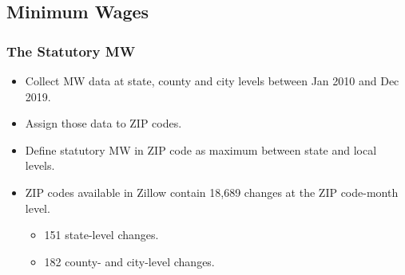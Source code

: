 
\subsection{Minimum Wages}

\begin{frame}[label=stat_MW]
	\frametitle{The Statutory MW}
	
	\begin{itemize}
		\item
		Collect MW data at state, county and city levels between Jan 2010 and Dec 2019.
		
		\vspace{2mm} \item
		Assign those data to ZIP codes.
		
		\vspace{2mm} \item
		Define statutory MW in ZIP code as maximum between state and local levels.
		
		\pause
		\vspace{2mm} \item
		ZIP codes available in Zillow contain 18,689 changes at the ZIP code-month level.
		\vspace{-3.5mm} 
		\begin{itemize} \small
			\item 151 state-level changes.
			\item 182 county- and city-level changes.
		\end{itemize}
		
		\hyperlink{dist_mw_changes}{}
	\end{itemize}
	
\end{frame}

